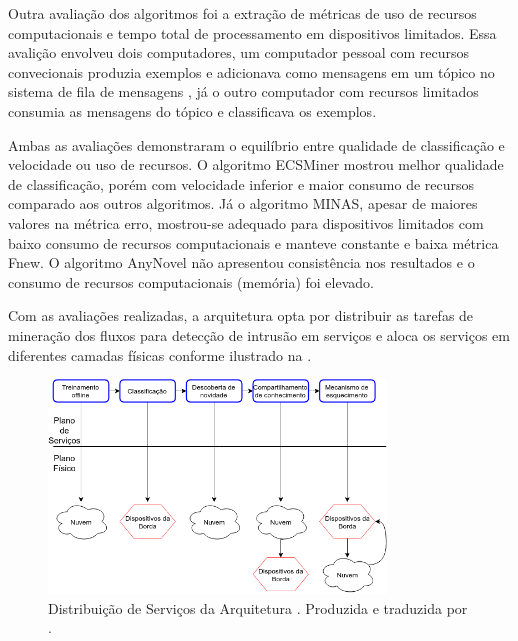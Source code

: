 Outra avaliação dos algoritmos foi a extração de métricas de uso de recursos
computacionais e tempo total de processamento em dispositivos limitados.
Essa avalição envolveu dois computadores, um computador pessoal com recursos
convecionais produzia exemplos e adicionava como mensagens em um tópico no
sistema de fila de mensagens \kafka, já o outro computador com recursos
limitados consumia as mensagens do tópico e classificava os exemplos.

Ambas as avaliações demonstraram o equilíbrio entre qualidade de classificação e
velocidade ou uso de recursos.
O algoritmo ECSMiner mostrou melhor qualidade de classificação, porém com
velocidade inferior e maior consumo de recursos comparado aos outros algoritmos.
Já o algoritmo MINAS, apesar de maiores valores na métrica erro, mostrou-se
adequado para dispositivos limitados com baixo consumo de recursos
computacionais e manteve constante e baixa métrica Fnew.
O algoritmo AnyNovel não apresentou consistência nos resultados e o consumo
de recursos computacionais (memória) foi elevado.


Com as avaliações realizadas, a arquitetura \idsiot opta por distribuir as
tarefas de mineração dos fluxos para detecção de intrusão em serviços e aloca os
serviços em diferentes camadas físicas conforme ilustrado na .

\begin{figure}[hbt]
\centering
\includegraphics[width=0.8\textwidth]{figuras/idsa-iot-quali-004.png}
\caption{Distribuição de Serviços da Arquitetura \idsiot.
Produzida e traduzida por .}
\label{fig:ids-iot}
\end{figure}

